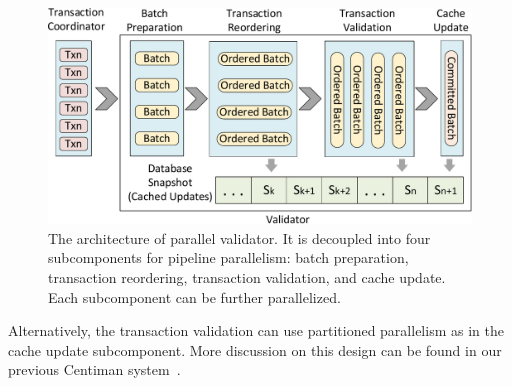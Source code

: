 \begin{figure}[t]
	\centering
	\includegraphics[width=1\columnwidth]{./figures/validator}
	\vspace{-2em}
	\caption{The architecture of parallel validator. It is decoupled into four subcomponents for pipeline parallelism: batch preparation, transaction reordering, transaction validation, and cache update. Each subcomponent can be further parallelized.}
	\vspace{-1em}
	\label{fig:reorder:validator}
\end{figure}

Alternatively, the transaction validation can use partitioned parallelism as in the cache update subcomponent. More discussion on this design can be found in our previous Centiman system~\cite{ding2015centiman}.

